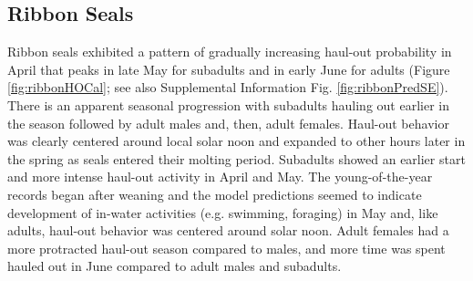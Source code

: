 \documentclass[fleqn,10pt,lineno]{wlpeerj} %
\begin{document}
\subsection*{Ribbon Seals}\label{ribbon-seals}

Ribbon seals exhibited a pattern of gradually increasing haul-out probability in
April that peaks in late May for subadults and in early June for adults (Figure
\ref{fig:ribbonHOCal}; see also Supplemental Information Fig.
\ref{fig:ribbonPredSE}). There is an apparent seasonal progression with
subadults hauling out earlier in the season followed by adult males and, then,
adult females. Haul-out behavior was clearly centered around local solar noon
and expanded to other hours later in the spring as seals entered their molting
period. Subadults showed an earlier start and more intense haul-out activity in
April and May. The young-of-the-year records began after weaning and the model
predictions seemed to indicate development of in-water activities (e.g.
swimming, foraging) in May and, like adults, haul-out behavior was centered
around solar noon. Adult females had a more protracted haul-out season compared
to males, and more time was spent hauled out in June compared to adult males and
subadults.
\end{document}
